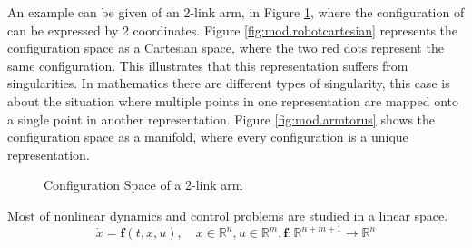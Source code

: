 An example can be given of an 2-link arm, in Figure \ref{fig:mod.armmanifold}, where the configuration of can be expressed by 2 coordinates. Figure \ref{fig:mod.robotcartesian} represents the configuration space as a Cartesian space, where the two red dots represent the same configuration. This illustrates that this representation suffers from singularities. In mathematics there are different types of singularity, this case is about the situation where multiple points in one representation are mapped onto a single point in another representation. Figure \ref{fig:mod.armtorus} shows the configuration space as a manifold, where every configuration is a unique representation.

\begin{figure}[h!]
	\centering
	\caption{Configuration Space of a 2-link arm\label{fig:mod.armmanifold}}
\end{figure}		




Most of nonlinear dynamics and control problems are studied in a linear space.\\
\begin{equation}\label{key}
\dot{x}=\textbf{f}(t,x,u), \quad x\in\mathbb{R}^n, u\in\mathbb{R}^m, \textbf{f}:\mathbb{R}^{n+m+1}\rightarrow\mathbb{R}^n
\end{equation}

